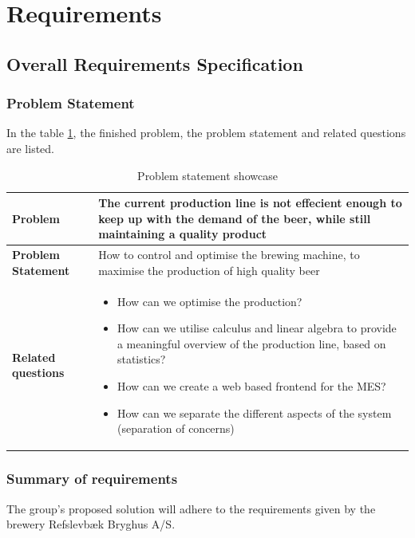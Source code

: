 \section{Requirements}

\subsection{Overall Requirements Specification}
\subsubsection{Problem Statement}
In the table \ref{table:problem-statement}, the finished problem, the problem statement and related questions are listed.
\begin{table}[ht]
    \begin{tabularx}{\textwidth}{|>{\RaggedRight}p{4cm}|>{\RaggedRight}X|}
        \hline
        \textbf{Problem} & The current production line is not effecient enough to keep up with the demand of the beer, while still maintaining a quality product\\
        \hline
        \textbf{Problem Statement} & How to control and optimise the brewing machine, to maximise the production of high quality beer\\
        \hline
        \textbf{Related questions} & 
            \begin{itemize}
                \item How can we optimise the production?
                \item How can we utilise calculus and linear algebra to provide a meaningful overview of the production line, based on statistics?
                \item How can we create a web based frontend for the MES?
                \item How can we separate the different aspects of the system (separation of concerns)
            \end{itemize}
        \\ 
        \hline
    \end{tabularx}
    \caption{Problem statement showcase} 
    \label{table:problem-statement}
\end{table} 

\subsubsection{Summary of requirements}
The group's proposed solution will adhere to the requirements given by the brewery Refslevbæk Bryghus A/S.

